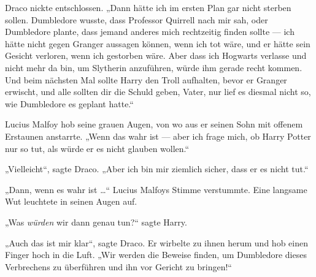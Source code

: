 Draco nickte entschlossen.
„Dann hätte ich im ersten Plan gar nicht sterben sollen. Dumbledore wusste, dass Professor Quirrell nach mir sah, oder Dumbledore plante, dass jemand anderes mich rechtzeitig finden sollte — ich hätte nicht gegen Granger aussagen können, wenn ich tot wäre, und er hätte sein Gesicht verloren, wenn ich gestorben wäre. Aber dass ich Hogwarts verlasse und nicht mehr da bin, um Slytherin anzuführen, würde ihm gerade recht kommen. Und beim nächsten Mal sollte Harry den Troll aufhalten, bevor er Granger erwischt, und alle sollten dir die Schuld geben, Vater, nur lief es diesmal nicht so, wie Dumbledore es geplant hatte.“

Lucius Malfoy hob seine grauen Augen, von wo aus er seinen Sohn mit offenem Erstaunen anstarrte.
„Wenn das wahr ist — aber ich frage mich, ob Harry Potter nur so tut, als würde er es nicht glauben wollen.“

„Vielleicht“, sagte Draco.
„Aber ich bin mir ziemlich sicher, dass er es nicht tut.“

„Dann, wenn es wahr ist …“
Lucius Malfoys Stimme verstummte. Eine langsame Wut leuchtete in seinen Augen auf.

„Was \emph{würden} wir dann genau tun?“ sagte Harry.

„Auch das ist mir klar“, sagte Draco. Er wirbelte zu ihnen herum und hob einen Finger hoch in die Luft.
„Wir werden die Beweise finden, um Dumbledore dieses Verbrechens zu überführen und ihn vor Gericht zu bringen!“

